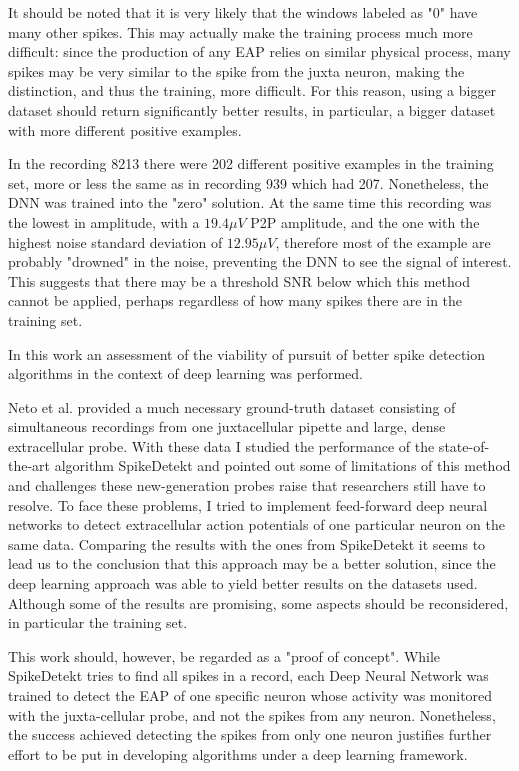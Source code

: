 \documentclass[10pt]{article}
\begin{document}
It should be noted that it is very likely that the windows labeled as "0" have many other spikes. This may actually make the training process much more difficult: since the production of any EAP relies on similar physical process, many spikes may be very similar to the spike from the juxta neuron, making the distinction, and thus the training, more difficult. For this reason, using a bigger dataset should return significantly better results, in particular, a bigger dataset with more different positive examples.

In the recording 8213 there were 202 different positive examples in the training set, more or less the same as in recording 939 which had 207. Nonetheless, the DNN was trained into the "zero" solution. At the same time this recording was the lowest in amplitude, with a $19.4 \mu V$ P2P amplitude, and the one with the highest noise standard deviation of $12.95 \mu V$, therefore most of the example are probably "drowned" in the noise, preventing the DNN to see the signal of interest. This suggests that there may be a threshold SNR below which this method cannot be applied, perhaps regardless of how many spikes there are in the training set.


In this work an assessment of the viability of pursuit of better spike detection algorithms in the context of deep learning was performed. 

Neto et al. provided a much necessary ground-truth dataset consisting of simultaneous recordings from one juxtacellular pipette and large, dense extracellular probe. With these data I studied the performance of the state-of-the-art algorithm SpikeDetekt and pointed out some of limitations of this method and challenges these new-generation probes raise that researchers still have to resolve. To face these problems, I tried to implement feed-forward deep neural networks to detect extracellular action potentials of one particular neuron on the same data. Comparing the results with the ones from SpikeDetekt it seems to lead us to the conclusion that this approach may be a better solution, since the deep learning approach was able to yield better results on the datasets used. Although some of the results are promising, some aspects should be reconsidered, in particular the training set. 

This work should, however, be regarded as a "proof of concept". While SpikeDetekt tries to find all spikes in a record, each Deep Neural Network was trained to detect the EAP of one specific neuron whose activity was monitored with the juxta-cellular probe, and not the spikes from any neuron. Nonetheless, the success achieved detecting the spikes from only one neuron justifies further effort to be put in developing algorithms under a deep learning framework.


\end{document}
